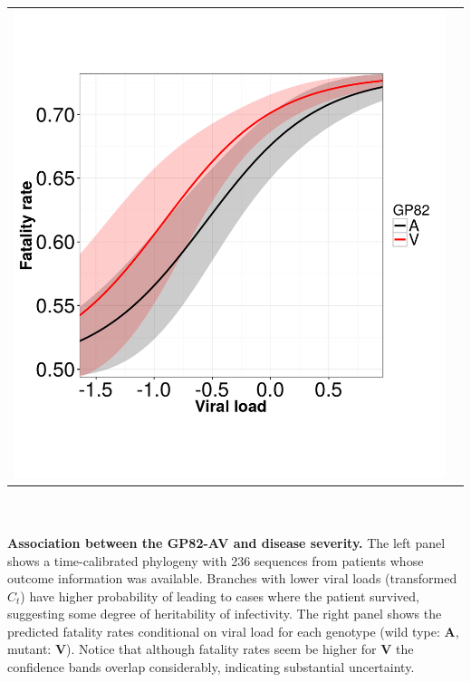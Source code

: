 \documentclass[portrait,a0paper,fontscale=0.315]{baposter}
\begin{document}
\begin{poster}
{\begin{tabular}{cc}
 \includegraphics[scale=0.35,valign=c]{images/predicted_fatality_rates.pdf}
\end{tabular} \\
\\
\textbf{Association between the GP82-AV and disease severity.}
The left panel shows a time-calibrated phylogeny with 236 sequences from patients whose outcome information was available.
Branches with lower viral loads (transformed $C_t$) have higher probability of leading to cases where the patient survived, suggesting some degree of heritability of infectivity.
The right panel shows the predicted fatality rates conditional on viral load for each genotype (wild type: \textbf{A}, mutant: \textbf{V}).
Notice that although fatality rates seem be higher for \textbf{V} the confidence bands overlap considerably, indicating substantial uncertainty.\\
\\
\begin{tabular}{ccc}

\end{tabular}}
\end{poster}
\end{document}
